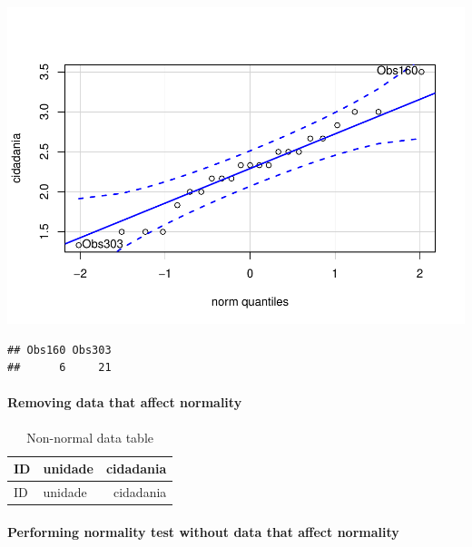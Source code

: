 \documentclass[]{article}
\newenvironment{Shaded}{\begin{snugshade}}{\end{snugshade}}
\newcommand{\CommentTok}[1]{\textcolor[rgb]{0.56,0.35,0.01}{\textit{#1}}}
\newcommand{\KeywordTok}[1]{\textcolor[rgb]{0.13,0.29,0.53}{\textbf{#1}}}
\newcommand{\NormalTok}[1]{#1}
\newcommand{\OperatorTok}[1]{\textcolor[rgb]{0.81,0.36,0.00}{\textbf{#1}}}
\newcommand{\StringTok}[1]{\textcolor[rgb]{0.31,0.60,0.02}{#1}}
\let\oldparagraph\paragraph
\renewcommand{\paragraph}[1]{\oldparagraph{#1}\mbox{}}
\begin{document}
\includegraphics{factorialAnova_files/figure-latex/unnamed-chunk-11-1.pdf}

\begin{verbatim}
## Obs160 Obs303 
##      6     21
\end{verbatim}

\hypertarget{removing-data-that-affect-normality}{%
\paragraph{Removing data that affect
normality}\label{removing-data-that-affect-normality}}

\begin{Shaded}
\end{Shaded}

\begin{longtable}[]{@{}llr@{}}
\caption{Non-normal data table}\tabularnewline
\toprule
ID & unidade & cidadania\tabularnewline
\midrule
\endfirsthead
\toprule
ID & unidade & cidadania\tabularnewline
\midrule
\endhead
\bottomrule
\end{longtable}

\hypertarget{performing-normality-test-without-data-that-affect-normality}{%
\paragraph{Performing normality test without data that affect
normality}\label{performing-normality-test-without-data-that-affect-normality}}
\end{document}
